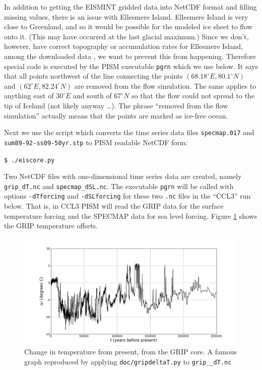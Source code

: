 \documentclass[11pt,final]{amsart}
\newcommand{\und}{\_\!\_}
\begin{document}
In addition to getting the EISMINT gridded data into NetCDF format and filling missing values, there is an issue with Ellesmere Island.  Ellesmere Island is very close to Greenland, and so it would be possible for the modeled ice sheet to flow onto it.  (This may have occurred at the last glacial maximum.)  Since we don't, however, have correct topography or accumulation rates for Ellesmere Island, among the downloaded data \cite{RitzEISMINT}, we want to prevent this from happening.  Therefore special code is executed by the PISM executable \verb|pgrn| which we use below.  It says that all points northwest of the line connecting the points $(68.18^\circ E, 80.1^\circ N)$ and $(62^\circ E, 82.24^\circ N)$ are removed from the flow simulation.  The same applies to anything east of $30^\circ E$ and south of $67^\circ N$ so that the flow could not spread to the tip of Iceland (not likely anyway \dots).  The phrase ``removed from the flow simulation'' actually means that the points are marked as ice-free ocean.

Next we use the script which converts the time series data files \verb|specmap.017| and \verb|sum89-92-ss09-50yr.stp| to  PISM readable NetCDF form:

\verb|$ ./eiscore.py|

\noindent Two NetCDF files with one-dimensional time series data are created, namely \verb|grip_dT.nc| and \verb|specmap_dSL.nc|.  The executable \verb|pgrn| will be called with options \verb|-dTforcing| and \verb|-dSLforcing| for these two \verb|.nc| files in the ``CCL3'' run below.  That is, in CCL3 PISM will read the GRIP data \cite{Dansgaardetal1993} for the surface temperature forcing and the SPECMAP data \cite{Imbrieetal1984} for sea level forcing.  Figure \ref{fig:gripDeltaT} shows the GRIP temperature offsets.

\begin{figure}[ht]
\includegraphics[width=5.6in,keepaspectratio=true]{figs/gripDeltaT}
\caption{Change in temperature from present, from the GRIP core.  A famous graph reproduced by applying \texttt{doc/gripdeltaT.py} to \texttt{grip\und dT.nc}}
\label{fig:gripDeltaT}
\end{figure}
\end{document}

